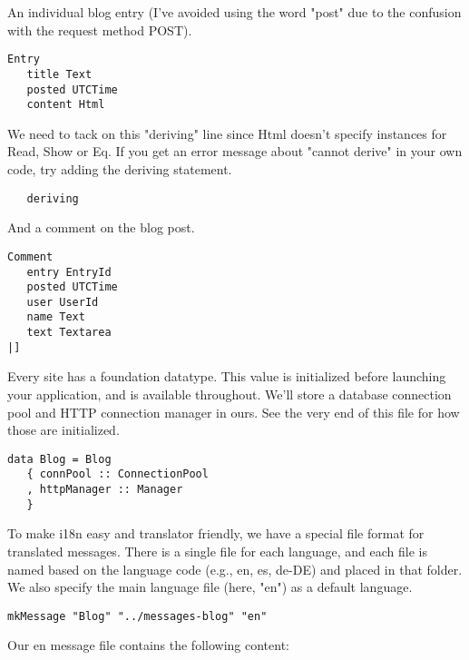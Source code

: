 An individual blog entry (I've avoided using the word "post" due to the confusion with the request method POST).

\begin{lstlisting}
Entry
   title Text
   posted UTCTime
   content Html
\end{lstlisting}

We need to tack on this "deriving" line since Html doesn't specify instances for Read, Show or Eq. If you get an error message about "cannot derive" in your own code, try adding the deriving statement.

\begin{lstlisting}
   deriving
\end{lstlisting}

And a comment on the blog post.

\begin{lstlisting}
Comment
   entry EntryId
   posted UTCTime
   user UserId
   name Text
   text Textarea
|]
\end{lstlisting}

Every site has a foundation datatype. This value is initialized before launching your application, and is available throughout. We'll store a database connection pool and HTTP connection manager in ours. See the very end of this file for how those are initialized.

\begin{lstlisting}
data Blog = Blog
   { connPool :: ConnectionPool
   , httpManager :: Manager
   }
\end{lstlisting}

To make i18n easy and translator friendly, we have a special file format for translated messages. There is a single file for each language, and each file is named based on the language code (e.g., en, es, de-DE) and placed in that folder. We also specify the main language file (here, "en") as a default language.

\begin{lstlisting}
mkMessage "Blog" "../messages-blog" "en"
\end{lstlisting}

Our en message file contains the following content:

